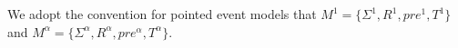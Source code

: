 \documentclass[12pt, a4paper, titlepage]{scrartcl}
\newcommand{\aRel}[1] {
  \sim_{#1} 
}
\newcommand{\actModel}[3]{
  (#1, \aRel{#2}, #3)
}
\newtheorem{defn}{Definition}
\newtheorem{lemma}{Lemma}
\begin{document}

We adopt the convention for pointed event models that $M^1 = \{\Sigma^1, R^1,
pre^1, T^1\}$ and $M^\alpha = \{\Sigma^\alpha,R^\alpha,pre^\alpha,T^\alpha\}$.\\
\\
\end{document}

